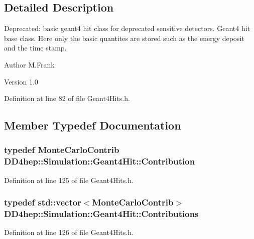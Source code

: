 \subsection{Detailed Description}
Deprecated: basic geant4 hit class for deprecated sensitive detectors. Geant4 hit base class. Here only the basic quantites are stored such as the energy deposit and the time stamp.

\begin{DoxyAuthor}{Author}
M.Frank 
\end{DoxyAuthor}
\begin{DoxyVersion}{Version}
1.0 
\end{DoxyVersion}


Definition at line 82 of file Geant4Hits.h.

\subsection{Member Typedef Documentation}
\hypertarget{class_d_d4hep_1_1_simulation_1_1_geant4_hit_a03a5270c4d1410302fe278ce6a47f268}{
\subsubsection[{Contribution}]{\setlength{\rightskip}{0pt plus 5cm}typedef {\bf MonteCarloContrib} {\bf DD4hep::Simulation::Geant4Hit::Contribution}}}
\label{class_d_d4hep_1_1_simulation_1_1_geant4_hit_a03a5270c4d1410302fe278ce6a47f268}


Definition at line 125 of file Geant4Hits.h.\hypertarget{class_d_d4hep_1_1_simulation_1_1_geant4_hit_acdc278ce7e641d337b024d5fc8f52a2c}{
\subsubsection[{Contributions}]{\setlength{\rightskip}{0pt plus 5cm}typedef std::vector$<${\bf MonteCarloContrib}$>$ {\bf DD4hep::Simulation::Geant4Hit::Contributions}}}
\label{class_d_d4hep_1_1_simulation_1_1_geant4_hit_acdc278ce7e641d337b024d5fc8f52a2c}


Definition at line 126 of file Geant4Hits.h.

